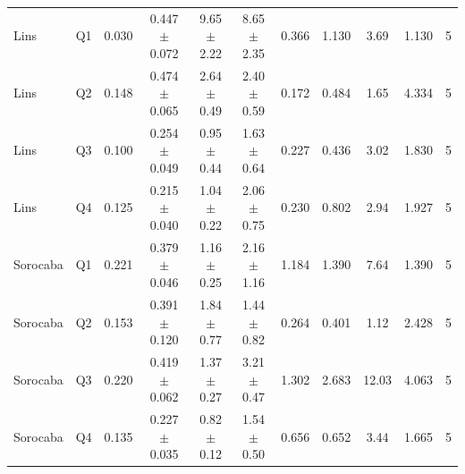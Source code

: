 \begin{table}[t]
{\begin{tabular}{ll c ccc c cc c c}
Lins & Q1 & 0.030 & 0.447 $\pm$ 0.072 & 9.65 $\pm$ 2.22 & 8.65 $\pm$ 2.35 & 0.366 & 1.130 & 3.69 & 1.130 & 5 \\
Lins & Q2 & 0.148 & 0.474 $\pm$ 0.065 & 2.64 $\pm$ 0.49 & 2.40 $\pm$ 0.59 & 0.172 & 0.484 & 1.65 & 4.334 & 5 \\
Lins & Q3 & 0.100 & 0.254 $\pm$ 0.049 & 0.95 $\pm$ 0.44 & 1.63 $\pm$ 0.64 & 0.227 & 0.436 & 3.02 & 1.830 & 5 \\
Lins & Q4 & 0.125 & 0.215 $\pm$ 0.040 & 1.04 $\pm$ 0.22 & 2.06 $\pm$ 0.75 & 0.230 & 0.802 & 2.94 & 1.927 & 5 \\
Sorocaba & Q1 & 0.221 & 0.379 $\pm$ 0.046 & 1.16 $\pm$ 0.25 & 2.16 $\pm$ 1.16 & 1.184 & 1.390 & 7.64 & 1.390 & 5 \\
Sorocaba & Q2 & 0.153 & 0.391 $\pm$ 0.120 & 1.84 $\pm$ 0.77 & 1.44 $\pm$ 0.82 & 0.264 & 0.401 & 1.12 & 2.428 & 5 \\
Sorocaba & Q3 & 0.220 & 0.419 $\pm$ 0.062 & 1.37 $\pm$ 0.27 & 3.21 $\pm$ 0.47 & 1.302 & 2.683 & 12.03 & 4.063 & 5 \\
Sorocaba & Q4 & 0.135 & 0.227 $\pm$ 0.035 & 0.82 $\pm$ 0.12 & 1.54 $\pm$ 0.50 & 0.656 & 0.652 & 3.44 & 1.665 & 5 \\
\bottomrule
\end{tabular}%
}
\end{table}
